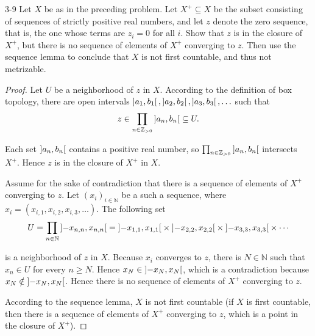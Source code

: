 \begin{problem}{3-9}
Let $X$ be as in the preceding problem. Let $X^{+}\subseteq X$ be the subset consisting of sequences of strictly positive real numbers, and let $z$ denote the zero sequence, that is, the one whose terms are $z_{i} = 0$ for all $i$. Show that $z$ is in the closure of $X^{+}$, but there is no sequence of elements of $X^{+}$ converging to $z$. Then use the sequence lemma to conclude that $X$ is not first countable, and thus not metrizable.
\end{problem}

\begin{proof}
    Let $U$ be a neighborhood of $z$ in $X$. According to the definition of box topology, there are open intervals $\left]{a_{1}, b_{1}}\right[, \left]{a_{2}, b_{2}}\right[, \left]{a_{3}, b_{3}}\right[, \ldots$ such that
    \begin{align*}
        z \in \prod_{n\in\mathbb{Z}_{> 0}}\left]{a_{n}, b_{n}}\right[ \subseteq U.
    \end{align*}

    Each set $\left]{a_{n}, b_{n}}\right[$ contains a positive real number, so $\prod_{n\in\mathbb{Z}_{> 0}}\left]{a_{n}, b_{n}}\right[$ intersects $X^{+}$. Hence $z$ is in the closure of $X^{+}$ in $X$.

    Assume for the sake of contradiction that there is a sequence of elements of $X^{+}$ converging to $z$. Let ${(x_{i})}_{i\in\mathbb{N}}$ be a such a sequence, where $x_{i} = (x_{i,1}, x_{i,2}, x_{i,3}, \ldots)$. The following set
    \begin{align*}
        U = \prod_{n\in\mathbb{N}}\left]{-x_{n,n}, x_{n,n}}\right[ = \left]{-x_{1,1}, x_{1,1}}\right[\times \left]{-x_{2,2}, x_{2,2}}\right[ \times \left]{-x_{3,3}, x_{3,3}}\right[\times \cdots
    \end{align*}

    is a neighborhood of $z$ in $X$. Because $x_{i}$ converges to $z$, there is $N\in\mathbb{N}$ such that $x_{n}\in U$ for every $n\geq N$. Hence $x_{N} \in \left]{-x_{N}, x_{N}}\right[$, which is a contradiction because $x_{N} \notin \left]{-x_{N}, x_{N}}\right[$. Hence there is no sequence of elements of $X^{+}$ converging to $z$.

    According to the sequence lemma, $X$ is not first countable (if $X$ is first countable, then there is a sequence of elements of $X^{+}$ converging to $z$, which is a point in the closure of $X^{+}$).
\end{proof}

